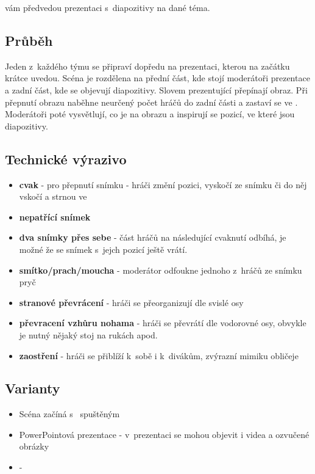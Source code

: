  vám předvedou prezentaci s~diapozitivy na dané téma. 
 
\subsection{ Průběh } Jeden  z~každého týmu se připraví dopředu na prezentaci, kterou na začátku krátce uvedou. Scéna je rozdělena na přední část, kde stojí moderátoři prezentace a zadní část, kde se objevují diapozitivy. Slovem   prezentující přepínají obraz. Při přepnutí obrazu naběhne neurčený počet hráčů do zadní části a zastaví se ve . Moderátoři poté vysvětlují, co je na obrazu a inspirují se pozicí, ve které jsou diapozitivy. 
 
\subsection{ Technické výrazivo } \begin{itemize}
\item \textbf{cvak} - pro přepnutí snímku  - hráči změní pozici, vyskočí ze snímku či do něj vskočí a strnou ve 
\item \textbf{nepatřící snímek}
\item \textbf{dva snímky přes sebe} - část hráčů na následující cvaknutí odbíhá, je možné že se snímek s~jejch pozicí ještě vrátí.
\item \textbf{smítko/prach/moucha} - moderátor odfoukne jednoho z~hráčů ze snímku pryč
\item \textbf{stranové převrácení} - hráči se přeorganizují dle svislé osy
\item \textbf{převracení vzhůru nohama} - hráči se převrátí dle vodorovné osy, obvykle je nutný nějaký stoj na rukách apod.
\item \textbf{zaostření} - hráči se přiblíží k~sobě i k~divákům, zvýrazní mimiku obličeje
\end{itemize}
 
\subsection{ Varianty } \begin{itemize}
\item Scéna začíná s~  spuštěným
\item PowerPointová prezentace - v~prezentaci se mohou objevit i videa a ozvučené obrázky
\item {} -  
\end{itemize}
 
